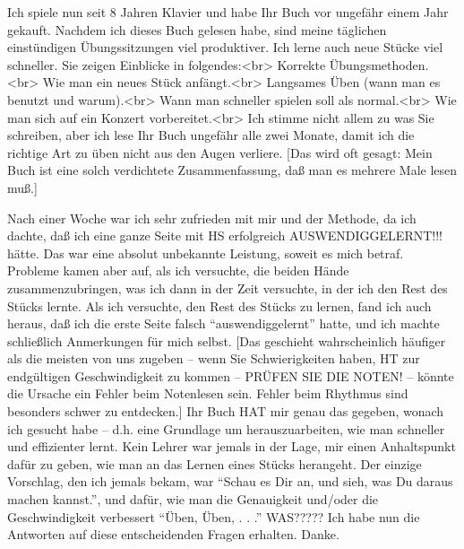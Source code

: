 \item \label{testimonials15}
Ich spiele nun seit 8 Jahren Klavier und habe Ihr Buch vor ungefähr einem Jahr gekauft.
Nachdem ich dieses Buch gelesen habe, sind meine täglichen einstündigen Übungssitzungen viel produktiver.
Ich lerne auch neue Stücke viel schneller.
Sie zeigen Einblicke in folgendes:<br>
Korrekte Übungsmethoden.<br>
Wie man ein neues Stück anfängt.<br>
Langsames Üben (wann man es benutzt und warum).<br>
Wann man schneller spielen soll als normal.<br>
Wie man sich auf ein Konzert vorbereitet.<br>
Ich stimme nicht allem zu was Sie schreiben, aber ich lese Ihr Buch ungefähr alle zwei Monate, damit ich die richtige Art zu üben nicht aus den Augen verliere.
[Das wird oft gesagt: Mein Buch ist eine solch verdichtete Zusammenfassung, daß man es mehrere Male lesen muß.]


\item \label{testimonials16}
Nach einer Woche war ich sehr zufrieden mit mir und der Methode, da ich dachte, daß ich eine ganze Seite mit HS erfolgreich AUSWENDIGGELERNT!!! hätte.
Das war eine absolut unbekannte Leistung, soweit es mich betraf.
Probleme kamen aber auf, als ich versuchte, die beiden Hände zusammenzubringen, was ich dann in der Zeit versuchte, in der ich den Rest des Stücks lernte.
Als ich versuchte, den Rest des Stücks zu lernen, fand ich auch heraus, daß ich die erste Seite falsch \enquote{auswendiggelernt} hatte, und ich machte schließlich Anmerkungen für mich selbst.
[Das geschieht wahrscheinlich häufiger als die meisten von uns zugeben -- wenn Sie Schwierigkeiten haben, HT zur endgültigen Geschwindigkeit zu kommen -- PRÜFEN SIE DIE NOTEN! -- könnte die Ursache ein Fehler beim Notenlesen sein.
Fehler beim Rhythmus sind besonders schwer zu entdecken.]
Ihr Buch HAT mir genau das gegeben, wonach ich gesucht habe -- d.h. eine Grundlage um herauszuarbeiten, wie man schneller und effizienter lernt.
Kein Lehrer war jemals in der Lage, mir einen Anhaltspunkt dafür zu geben, wie man an das Lernen eines Stücks herangeht.
Der einzige Vorschlag, den ich jemals bekam, war \enquote{Schau es Dir an, und sieh, was Du daraus machen kannst.}, und dafür, wie man die Genauigkeit und/oder die Geschwindigkeit verbessert \enquote{Üben, Üben, . . .} WAS?????
Ich habe nun die Antworten auf diese entscheidenden Fragen erhalten. Danke.


